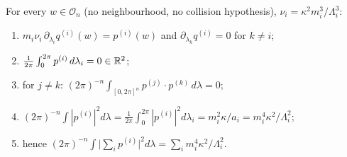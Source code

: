 \begin{proposition}\label{bpP:p8:lemma64}
For every $w\in\mathcal O_n$ (no neighbourhood, no collision hypothesis), $\nu_i=\kappa^2m_i^3/\Lambda_i^3$:
\begin{enumerate}[label=(\alph*)]
\item $m_i\nu_i\,\partial_{\lambda_i}q^{(i)}(w)=p^{(i)}(w)$ and $\partial_{\lambda_k}q^{(i)}=0$ for $k\ne i$;
\item $\frac1{2\pi}\int_0^{2\pi}p^{(i)}\,d\lambda_i=0\in\mathbb{R}^2$;
\item for $j\neq k$: $(2\pi)^{-n}\int_{[0,2\pi]^n}p^{(j)}\cdot p^{(k)}\,d\lambda=0$;
\item $(2\pi)^{-n}\int|p^{(i)}|^2d\lambda=\frac1{2\pi}\int_0^{2\pi}|p^{(i)}|^2d\lambda_i=m_i^2\kappa/a_i=m_i^4\kappa^2/\Lambda_i^2$;
\item hence $(2\pi)^{-n}\int\big|\sum_ip^{(i)}\big|^2d\lambda=\sum_im_i^4\kappa^2/\Lambda_i^2$.
\end{enumerate}
\end{proposition}
